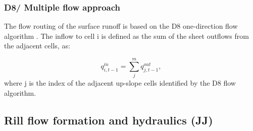         \subsubsection{D8/ Multiple flow approach}

            The flow routing of the surface runoff is based on the D8 one-direction flow
            algorithm \cite{o1984extraction}. The inflow to cell i is defined as the sum of the sheet
            outflows from the adjacent cells, as:

            \begin{equation} 
            q^{in}_{i,t-1} = \sum_j^m q^{out}_{j,t-1}, 
            \label{eq:d8}
            \end{equation} 
            where j is the index of the adjacent up-slope cells identified by the D8 flow
            algorithm.

 

        \subsection{Rill flow formation and hydraulics (JJ)}


